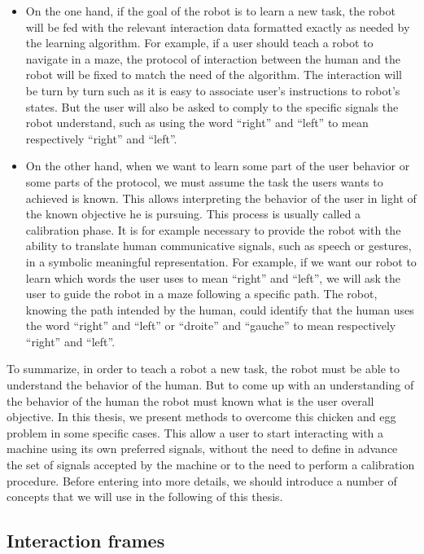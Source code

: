 \begin{itemize}

\item On the one hand, if the goal of the robot is to learn a new task, the robot will be fed with the relevant interaction data formatted exactly as needed by the learning algorithm. For example, if a user should teach a robot to navigate in a maze, the protocol of interaction between the human and the robot will be fixed to match the need of the algorithm. The interaction will be turn by turn such as it is easy to associate user's instructions to robot's states. But the user will also be asked to comply to the specific signals the robot understand, such as using the word ``right'' and ``left'' to mean respectively ``right'' and ``left''.

\item On the other hand, when we want to learn some part of the user behavior or some parts of the protocol, we must assume the task the users wants to achieved is known. This allows interpreting the behavior of the user in light of the known objective he is pursuing. This process is usually called a calibration phase. It is for example necessary to provide the robot with the ability to translate human communicative signals, such as speech or gestures, in a symbolic meaningful representation. For example, if we want our robot to learn which words the user uses to mean ``right'' and ``left'', we will ask the user to guide the robot in a maze following a specific path. The robot, knowing the path intended by the human, could identify that the human uses the word ``right'' and ``left'' or ``droite'' and ``gauche'' to mean respectively ``right'' and ``left''.

\end{itemize}

To summarize, in order to teach a robot a new task, the robot must be able to understand the behavior of the human. But to come up with an understanding of the behavior of the human the robot must known what is the user overall objective. In this thesis, we present methods to overcome this chicken and egg problem in some specific cases. This allow a user to start interacting with a machine using its own preferred signals, without the need to define in advance the set of signals accepted by the machine or to the need to perform a calibration procedure. Before entering into more details, we should introduce a number of concepts that we will use in the following of this thesis.

\subsection{Interaction frames}

